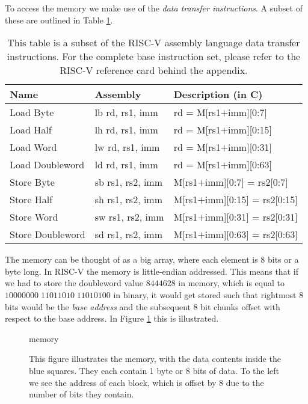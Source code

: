     To access the memory we make use of the \textit{data transfer instructions}. A subset of these are outlined in Table \ref{table:RISCVDataTranferInstructions}.
    
    \begin{table}[h!]
        \centering
        \begin{tabular}{|l|l|l|}
            \hline
            Name             & Assembly         & Description (in C)             \\ \hline
            Load Byte        & lb rd, rs1, imm  & rd = M[rs1$+$imm][0:7]         \\
            Load Half        & lh rd, rs1, imm  & rd = M[rs1$+$imm][0:15]        \\
            Load Word        & lw rd, rs1, imm  & rd = M[rs1$+$imm][0:31]        \\
            Load Doubleword  & ld rd, rs1, imm  & rd = M[rs1$+$imm][0:63]        \\ \hline
            Store Byte       & sb rs1, rs2, imm & M[rs1$+$imm][0:7] = rs2[0:7]   \\
            Store Half       & sh rs1, rs2, imm & M[rs1$+$imm][0:15] = rs2[0:15] \\
            Store Word       & sw rs1, rs2, imm & M[rs1$+$imm][0:31] = rs2[0:31] \\
            Store Doubleword & sd rs1, rs2, imm & M[rs1$+$imm][0:63] = rs2[0:63] \\ \hline
        \end{tabular}
        \caption{This table is a subset of the RISC-V assembly language data transfer instructions. For the complete base instruction set, please refer to the RISC-V reference card behind the appendix.}
        \label{table:RISCVDataTranferInstructions}
    \end{table}

    The memory can be thought of as a big array, where each element is 8 bits or a byte long. In RISC-V the memory is little-endian addressed. This means that if we had to store the doubleword value $8444628$ in memory, which is equal to $10000000 \; 11011010 \; 11010100$ in binary, it would get stored such that rightmost 8 bits would be the \textit{base address} and the subsequent 8 bit chunks offset with respect to the base address. In Figure \ref{fig:memory} this is illustrated.
    
    \begin{figure}[h!]
        \centering
        {memory}
        \caption{This figure illustrates the memory, with the data contents inside the blue squares. They each contain 1 byte or 8 bits of data. To the left we see the address of each block, which is offset by 8 due to the number of bits they contain.}
        \label{fig:memory}
    \end{figure}

